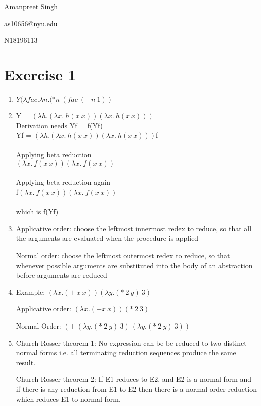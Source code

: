 \documentclass[12pt]{article}
\begin{document}
\begin{center}
{\huge Amanpreet Singh
 
as10656@nyu.edu

N18196113}

\end{center}


\section*{Exercise 1}

\begin{enumerate}[label=(\alph*)]

\item $Y(\lambda fac.\lambda n.(* n \ (fac \ (- n \ 1))$

\item Y = $(\lambda h. (\lambda x. \ h(x \ x))(\lambda x. \ h(x \ x))) $ \\
Derivation needs Yf = f(Yf) \\
Yf = $(\lambda h. (\lambda x. \ h(x \ x))(\lambda x. \ h(x \ x)))$f \\~\\
Applying beta reduction \\$(\lambda x. \ f(x \ x))(\lambda x. \ f(x \ x)) $  \\~\\
Applying beta reduction again  \\f$(\lambda x. \ f(x \ x))(\lambda x. \ f(x \ x)) $ \\~\\
which is f(Yf)

\item Applicative order: choose the leftmost innermost redex to reduce, so that all the arguments are evaluated when the procedure is applied

Normal order: choose the leftmost outermost redex to reduce, so that whenever possible arguments are substituted into the body of an abstraction before arguments are reduced
\item Example: $(\lambda x.(+\ x\ x))(\lambda y.(* \ 2 \ y) \ 3)$

Applicative order: $(\lambda x.(+ x \ x))(* \ 2 \ 3)$

Normal Order: $(+\ (\lambda y. (* \ 2 \ y) \  3) \ (\lambda y. (* \ 2 \ y)\ 3))$

\item Church Rosser theorem 1: No expression can be be reduced to two distinct normal forms i.e. all terminating reduction sequences produce the same result.

Church Rosser theorem 2: If E1 reduces to E2, and E2 is a normal form and if there is any reduction from E1 to E2 then there is a normal order reduction which reduces E1 to normal form.

\end{enumerate}
\end{document}
